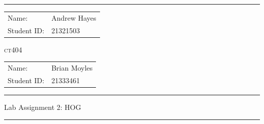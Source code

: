 \documentclass[a4paper]{article}
\begin{document}
\hrule \medskip
\begin{minipage}{0.295\textwidth} 
    \raggedright
    \footnotesize 
    \begin{tabular}{@{}l l} %
        Name: & Andrew Hayes \\
        Student ID: & 21321503 \\
    \end{tabular}
\end{minipage}
\begin{minipage}{0.4\textwidth} 
    \centering 
    \vspace{0.4em}
    \LARGE 
    \textsc{ct404} \\ 
\end{minipage}
\begin{minipage}{0.295\textwidth} 
    \raggedleft
    \footnotesize 
    \begin{tabular}{@{}l l} %
        Name: & Brian Moyles \\
        Student ID: & 21333461\\
    \end{tabular}
\end{minipage}
\smallskip
\hrule 
\begin{center}
    \normalsize
    Lab Assignment 2: HOG
\end{center}
\hrule
\end{document}
